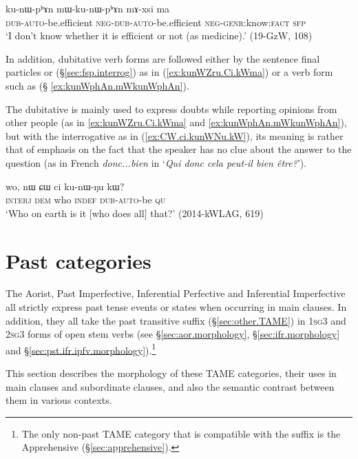 \begin{exe}
\ex \label{ex:kunWphAn.mWkunWphAn}
 \gll  ku-nɯ-pʰɤn mɯ-ku-nɯ-pʰɤn mɤ-xsi ma \\
 \textsc{dub}-\textsc{auto}-be.efficient \textsc{neg}-\textsc{dub}-\textsc{auto}-be.efficient \textsc{neg}-\textsc{genr}:know:\textsc{fact} \textsc{sfp} \\
\glt `I don't know whether it is efficient or not (as medicine).' (19-GzW, 108)
  \end{exe}

In addition, dubitative verb forms are followed either by the sentence final particles  or  (§\ref{sec:fsp.interrog}) as in (\ref{ex:kunWZru.Ci.kWma}) or a verb form such as  (§ \ref{ex:kunWphAn.mWkunWphAn}).

The dubitative is mainly used to express doubts while reporting opinions from other people (as in \ref{ex:kunWZru.Ci.kWma} and \ref{ex:kunWphAn.mWkunWphAn}), but with the interrogative  as in (\ref{ex:CW.ci.kunWNu.kW}), its meaning is rather that of emphasis on the fact that the speaker has no clue about the answer to the question (as in French \textit{donc...bien} in `\textit{Qui donc cela peut-il bien être?}').

\begin{exe}
\ex \label{ex:CW.ci.kunWNu.kW}
 \gll wo, nɯ ɕɯ ci ku-nɯ-ŋu kɯ?  \\
 \textsc{interj} \textsc{dem} who \textsc{indef} \textsc{dub}-\textsc{auto}-be \textsc{qu} \\
\glt `Who on earth is it [who does all] that?' (2014-kWLAG, 619)
 \end{exe}
 
\section{Past categories}   \label{sec:TAME.pst}
The Aorist, Past Imperfective, Inferential Perfective and Inferential Imperfective all strictly express past tense events or states when occurring in main clauses. In addition, they all take the past transitive  suffix (§\ref{sec:other.TAME}) in \textsc{1sg}\fl{}3 and \textsc{2sg}\fl{}3 forms of open stem verbs (see §\ref{sec:aor.morphology}, §\ref{sec:ifr.morphology} and §\ref{sec:pst.ifr.ipfv.morphology}).\footnote{The only non-past TAME category that is compatible with the  suffix is the Apprehensive (§\ref{sec:apprehensive}). }

This section describes the morphology of these TAME categories, their uses in main clauses and subordinate clauses, and also the semantic contrast between them in various contexts.


